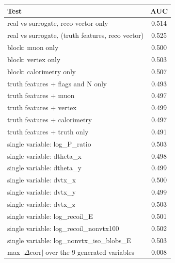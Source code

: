 \begin{tabular}{lc}
\toprule
Test & AUC \\
\midrule
real vs surrogate, reco vector only & 0.514 \\
real vs surrogate, (truth features, reco vector) & 0.525 \\
\midrule
block: muon only & 0.500 \\
block: vertex only & 0.503 \\
block: calorimetry only & 0.507 \\
truth features + flags and N only & 0.493 \\
truth features + muon & 0.497 \\
truth features + vertex & 0.499 \\
truth features + calorimetry & 0.497 \\
truth features + truth only & 0.491 \\
single variable: log\_P\_ratio & 0.503 \\
single variable: dtheta\_x & 0.498 \\
single variable: dtheta\_y & 0.499 \\
single variable: dvtx\_x & 0.500 \\
single variable: dvtx\_y & 0.499 \\
single variable: dvtx\_z & 0.503 \\
single variable: log\_recoil\_E & 0.501 \\
single variable: log\_recoil\_nonvtx100 & 0.502 \\
single variable: log\_nonvtx\_iso\_blobs\_E & 0.503 \\
\midrule
max $|\Delta$corr$|$ over the 9 generated variables & 0.008 \\
\bottomrule
\end{tabular}

